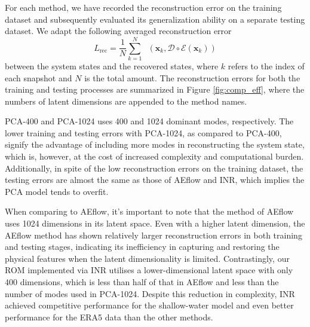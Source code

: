 \documentclass{article}
\newcommand{\mE}{\mathcal{E}}
\newcommand{\mD}{\mathcal{D}}
\DeclareMathOperator{\weightedloss}{\mathcal{L}^{\mathrm{weighted}}}
\begin{document}
For each method, we have recorded the reconstruction error on the training dataset and subsequently evaluated its generalization ability on a separate testing dataset. We adapt the following averaged reconstruction error
\[L_{\mathrm{rec}}=\frac1N\sum_{k=1}^N\weightedloss(\bm x_k,\mD\circ\mE(\bm x_k))\]
between the system states and the recovered states, where $k$ refers to the index of each snapshot and $N$ is the total amount. The reconstruction errors for both the training and testing processes are summarized in Figure \ref{fig:comp_eff}, where the numbers of latent dimensions are appended to the method names.

PCA-400 and PCA-1024 uses 400 and 1024 dominant modes, respectively. The lower training and testing errors with PCA-1024, as compared to PCA-400, signify the advantage of including more modes in reconstructing the system state, which is, however, at the cost of increased complexity and computational burden. Additionally, in spite of the low reconstruction errors on the training dataset, the testing errors are almost the same as those of AEflow and INR, which implies the PCA model tends to overfit.

When comparing to AEflow, it's important to note that the method of AEflow uses 1024 dimensions in its latent space. Even with a higher latent dimension, the AEflow method has shown relatively larger reconstruction errors in both training and testing stages, indicating its inefficiency in capturing and restoring the physical features when the latent dimensionality is limited. Contrastingly, our ROM implemented via INR utilises a lower-dimensional latent space with only 400 dimensions, which is less than half of that in AEflow and less than the number of modes used in PCA-1024. Despite this reduction in complexity, INR achieved competitive performance for the shallow-water model and even better performance for the ERA5 data than the other methods.
\end{document}
